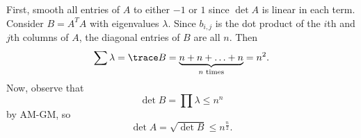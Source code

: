 First, smooth all entries of $A$ to either $-1$ or $1$ since $\det A$ is linear in each term. Consider $B=A^TA$ with eigenvalues $\lambda$. Since $b_{i,j}$ is the dot product of the $i$th and $j$th columns of $A$, the diagonal entries of $B$ are all $n$. Then \[\displaystyle\sum\lambda=\trace B=\underbrace{n+n+\ldots+n}_{n\text{ times}}=n^2.\] Now, observe that \[\det B=\displaystyle\prod\lambda\leq n^n\] by AM-GM, so \[\det A=\sqrt{\det B}\leq n^{\frac{n}{2}}.\]